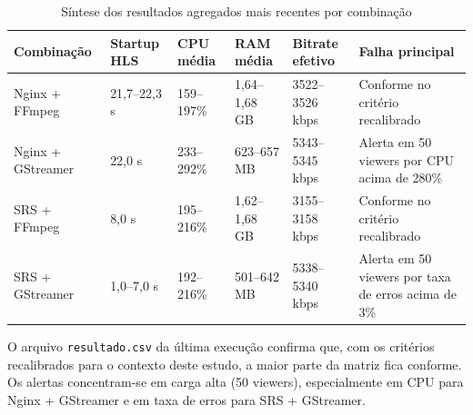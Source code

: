 \begin{table}[H]
\centering
\caption{Síntese dos resultados agregados mais recentes por combinação}
\begin{tabularx}{\textwidth}{@{}lXXXXX@{}}
\toprule
\textbf{Combinação} & \textbf{Startup HLS} & \textbf{CPU média} & \textbf{RAM média} & \textbf{Bitrate efetivo} & \textbf{Falha principal} \\
\midrule
Nginx + FFmpeg & 21,7--22,3 s & 159--197\% & 1,64--1,68 GB & 3522--3526 kbps & Conforme no critério recalibrado \\
Nginx + GStreamer & 22,0 s & 233--292\% & 623--657 MB & 5343--5345 kbps & Alerta em 50 viewers por CPU acima de 280\% \\
SRS + FFmpeg & 8,0 s & 195--216\% & 1,62--1,68 GB & 3155--3158 kbps & Conforme no critério recalibrado \\
SRS + GStreamer & 1,0--7,0 s & 192--216\% & 501--642 MB & 5338--5340 kbps & Alerta em 50 viewers por taxa de erros acima de 3\% \\
\bottomrule
\end{tabularx}
\end{table}

O arquivo \texttt{resultado.csv} da última execução confirma que, com os critérios recalibrados para o contexto deste estudo, a maior parte da matriz fica conforme. Os alertas concentram-se em carga alta (50 viewers), especialmente em CPU para Nginx + GStreamer e em taxa de erros para SRS + GStreamer.
